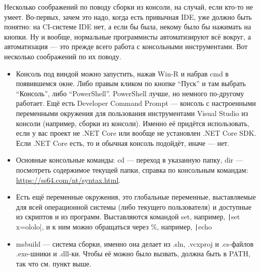 \documentclass[a5paper]{article}
\begin{document}
Несколько соображений по поводу сборки из консоли, на случай, если кто-то не умеет. Во-первых, зачем это надо, когда есть привычная IDE, уже должно быть понятно: на CI-системе IDE нет, а если бы была, некому было бы нажимать на кнопки. Ну и вообще, нормальные программисты автоматизируют всё вокруг, а автоматизация --- это прежде всего работа с консольными инструментами. Вот несколько соображений по их поводу.

\begin{itemize}
	\item Консоль под виндой можно запустить, нажав Win-R и набрав cmd в появившемся окне. Либо правым кликом по кнопке ``Пуск'' и там выбрать ``Консоль'', либо ``PowerShell''. PowerShell лучше, но немного по-другому работает. Ещё есть Developer Command Prompt --- консоль с настроенными переменными окружения для пользования инструментами Visual Studio из консоли (например, сборки из консоли). Именно её  придётся использовать, если у вас проект не .NET Core или вообще не установлен .NET Core SDK. Если .NET Core есть, то и обычная консоль подойдёт, иначе --- нет.
	\item Основные консольные команды: cd --- переход в указанную папку, dir --- посмотреть содержимое текущей папки, справка по консольным командам: \url{https://ss64.com/nt/syntax.html}.
	\item Есть ещё переменные окружения, это глобальные переменные, выставляемые для всей операционной системы (либо текущего пользователя) и доступные из скриптов и из программ. Выставляются командой set, например, \texttt|set x=ololo|, и к ним можно обращаться через \%, например, \texttt|echo %
	\item msbuild --- система сборки, именно она делает из .sln, .vcxproj и .cs-файлов .exe-шники и .dll-ки. Чтобы её можно было вызвать, должна быть в PATH, так что см. пункт выше.

\end{itemize}
\end{document}
